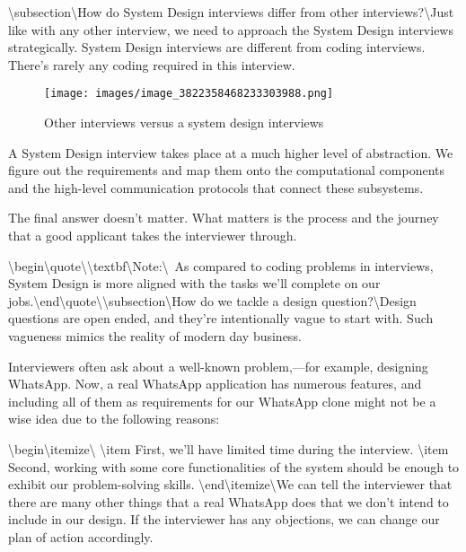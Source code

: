 \textbackslash{}subsection\textbackslash{}{How do System Design interviews differ from other interviews?\textbackslash{}}Just like with any other interview, we need to approach the System Design interviews strategically. System Design interviews are different from coding interviews. There’s rarely any coding required in this interview.

\begin{figure}[htbp]
    \centering
    \texttt{[image: images/image\_3822358468233303988.png]}
    \caption{Other interviews versus a system design interviews}
\end{figure}

A System Design interview takes place at a much higher level of abstraction. We figure out the requirements and map them onto the computational components and the high-level communication protocols that connect these subsystems.

The final answer doesn’t matter. What matters is the process and the journey that a good applicant takes the interviewer through.

\textbackslash{}begin\textbackslash{}{quote\textbackslash{}}\textbackslash{}textbf\textbackslash{}{Note:\textbackslash{}} As compared to coding problems in interviews, System Design is more aligned with the tasks we’ll complete on our jobs.\textbackslash{}end\textbackslash{}{quote\textbackslash{}}\textbackslash{}subsection\textbackslash{}{How do we tackle a design question?\textbackslash{}}Design questions are open ended, and they’re intentionally vague to start with. Such vagueness mimics the reality of modern day business.

Interviewers often ask about a well-known problem,—for example, designing WhatsApp. Now, a real WhatsApp application has numerous features, and including all of them as requirements for our WhatsApp clone might not be a wise idea due to the following reasons:

\textbackslash{}begin\textbackslash{}{itemize\textbackslash{}}
\textbackslash{}item First, we’ll have limited time during the interview.
\textbackslash{}item Second, working with some core functionalities of the system should be enough to exhibit our problem-solving skills.
\textbackslash{}end\textbackslash{}{itemize\textbackslash{}}We can tell the interviewer that there are many other things that a real WhatsApp does that we don’t intend to include in our design. If the interviewer has any objections, we can change our plan of action accordingly.

